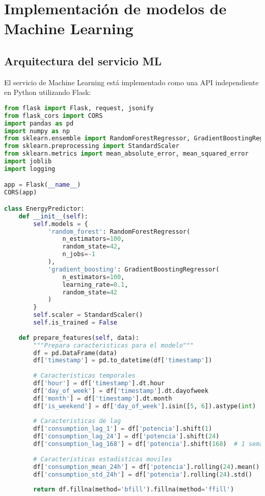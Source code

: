 \section{Implementación de modelos de Machine Learning}

\subsection{Arquitectura del servicio ML}

El servicio de Machine Learning está implementado como una API independiente en Python utilizando Flask:

\begin{lstlisting}[language=Python, caption=Estructura del servicio ML]
from flask import Flask, request, jsonify
from flask_cors import CORS
import pandas as pd
import numpy as np
from sklearn.ensemble import RandomForestRegressor, GradientBoostingRegressor
from sklearn.preprocessing import StandardScaler
from sklearn.metrics import mean_absolute_error, mean_squared_error
import joblib
import logging

app = Flask(__name__)
CORS(app)

class EnergyPredictor:
    def __init__(self):
        self.models = {
            'random_forest': RandomForestRegressor(
                n_estimators=100,
                random_state=42,
                n_jobs=-1
            ),
            'gradient_boosting': GradientBoostingRegressor(
                n_estimators=100,
                learning_rate=0.1,
                random_state=42
            )
        }
        self.scaler = StandardScaler()
        self.is_trained = False
        
    def prepare_features(self, data):
        """Prepara caracteristicas para el modelo"""
        df = pd.DataFrame(data)
        df['timestamp'] = pd.to_datetime(df['timestamp'])
        
        # Caracteristicas temporales
        df['hour'] = df['timestamp'].dt.hour
        df['day_of_week'] = df['timestamp'].dt.dayofweek
        df['month'] = df['timestamp'].dt.month
        df['is_weekend'] = df['day_of_week'].isin([5, 6]).astype(int)
        
        # Caracteristicas de lag
        df['consumption_lag_1'] = df['potencia'].shift(1)
        df['consumption_lag_24'] = df['potencia'].shift(24)
        df['consumption_lag_168'] = df['potencia'].shift(168)  # 1 semana
        
        # Caracteristicas estadisticas moviles
        df['consumption_mean_24h'] = df['potencia'].rolling(24).mean()
        df['consumption_std_24h'] = df['potencia'].rolling(24).std()
        
        return df.fillna(method='bfill').fillna(method='ffill')
\end{lstlisting}

